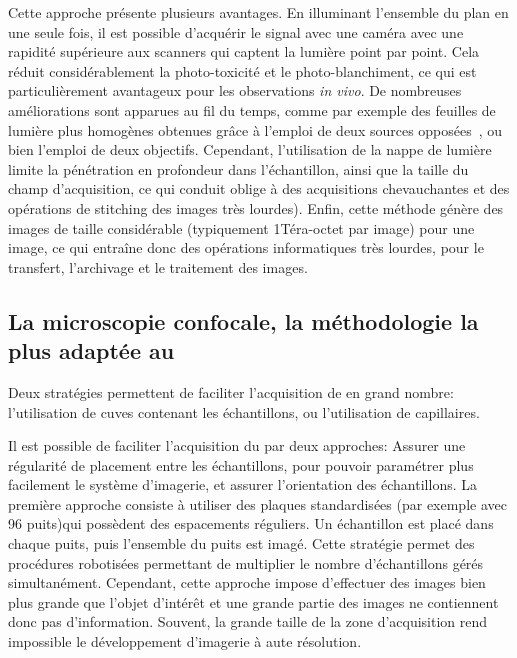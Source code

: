 \documentclass[\main/main.tex]{subfiles}
\begin{document}
Cette approche présente plusieurs avantages. En illuminant l'ensemble du plan en une seule fois, il est possible d'acquérir le signal avec une caméra avec une rapidité supérieure aux scanners qui captent la lumière point par point.
Cela réduit considérablement la photo-toxicité et le photo\hyp{}blanchiment, ce qui est particulièrement avantageux pour les observations  \textit{in vivo}.
%
De nombreuses améliorations sont apparues au fil du temps, comme par exemple des feuilles de lumière plus homogènes obtenues grâce à l'emploi de deux sources opposées~\cite{huisken_2007}, ou bien l'emploi de deux objectifs.
%
Cependant, l'utilisation de la nappe de lumière limite la pénétration en profondeur dans l'échantillon, ainsi que la taille du champ d'acquisition, ce qui conduit oblige à des acquisitions chevauchantes et des opérations de stitching des images très lourdes). Enfin, cette méthode génère des images de taille considérable (typiquement 1Téra-octet par image) pour une image, ce qui entraîne donc des opérations informatiques très lourdes, pour le transfert, l'archivage et le traitement des images.

    \subsection{La microscopie confocale, la méthodologie la plus adaptée au \hcs{}}
    
Deux stratégies  permettent de faciliter l'acquisition de \pz{} en grand nombre: l'utilisation de cuves contenant les échantillons, ou l'utilisation de capillaires.
   
%
Il est possible de faciliter l'acquisition du \pz{} par deux approches:
Assurer une régularité de placement entre les échantillons,
pour pouvoir paramétrer plus facilement le système d'imagerie, et assurer l'orientation des échantillons.
%
La première approche consiste à utiliser des plaques standardisées (par exemple avec 96 puits)qui possèdent des espacements réguliers. Un échantillon est placé dans chaque puits, puis l'ensemble du puits est imagé. Cette stratégie permet des procédures robotisées permettant de multiplier le nombre d'échantillons gérés simultanément.
%
Cependant, cette approche impose d'effectuer des images bien plus grande que l'objet d'intérêt et une grande partie des images ne contiennent donc pas d'information. Souvent, la grande taille de la zone d'acquisition rend impossible le développement d'imagerie à aute résolution.
\end{document}
